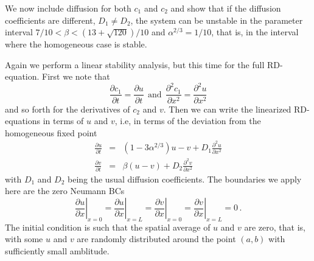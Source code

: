 We now include diffusion for both $c_1$ and $c_2$ and show that if the diffusion coefficients 
are different, $D_1 \neq D_2$, the system can be unstable in the parameter interval 
$7/10 <\beta < (13 + \sqrt{120})/10$ and $\alpha^{2/3} = 1/10$, 
that is, in the interval where the homogeneous case is stable.  

Again we perform a linear stability analysis, but this time for the full RD-equation. 
First we note that 
\begin{equation}
	\frac{\partial c_1}{\partial t} = \frac{\partial u}{\partial t} \ \ \text{and} \ \ 
	\frac{\partial^2 c_1}{\partial x^2} = \frac{\partial^2 u}{\partial x^2}
\end{equation}
and so forth for the derivatives of $c_2$ and $v$. Then we can write the linearized 
RD-equations in terms of $u$ and $v$, i.e, in terms of the deviation from the homogeneous fixed point
\begin{eqnarray}
	\label{eq:fhnlin1}
	\frac{\partial u}{\partial t} &=& (1-3\alpha^{2/3})u - v + D_1 \frac{\partial^2 u}{\partial x^2}\\
	\label{eq:fhnlin2}
	\frac{\partial v}{\partial t} &=& \beta(u-v) + D_2 \frac{\partial^2 v}{\partial x^2}
\end{eqnarray}
with $D_1$ and $D_2$ being the usual diffusion coefficients. The boundaries we apply here are the zero Neumann BCs 
\begin{equation}
	\left.\frac{\partial u}{\partial x}\right|_{x=0} = \left.\frac{\partial u}{\partial x}\right|_{x=L} = \left.\frac{\partial v}{\partial x}\right|_{x=0} = \left.\frac{\partial v}{\partial x}\right|_{x=L} = 0 \, .
\end{equation}
The initial condition is such that the spatial average of $u$ and $v$ are zero, that is, with some $u$ and $v$ are randomly distributed around the
point $(a,b)$ with sufficiently small amblitude. 

